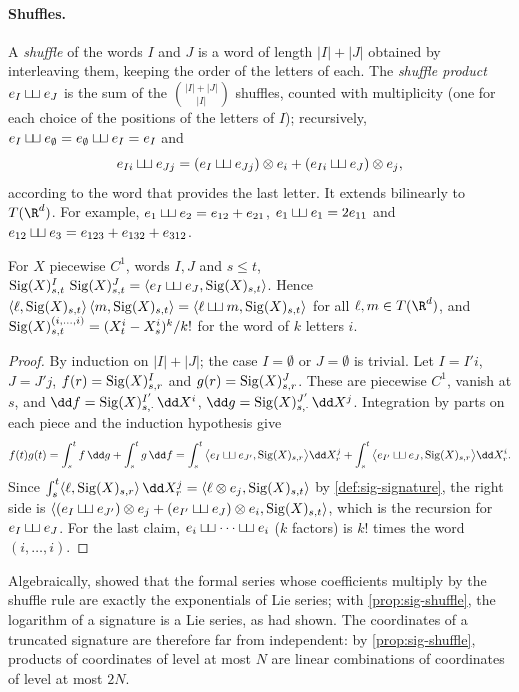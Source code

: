 \paragraph{Shuffles.} A \emph{shuffle} of the words $I$ and $J$ is a word of length $|I|+|J|$ obtained by
interleaving them, keeping the order of the letters of each. The \emph{shuffle product}
$e_I\mathbin{\sqcup\mkern-3mu\sqcup} e_J$ is the sum of the $\binom{|I|+|J|}{|I|}$ shuffles, counted with multiplicity (one for each choice
of the positions of the letters of $I$); recursively, $e_I\mathbin{\sqcup\mkern-3mu\sqcup} e_\emptyset=e_\emptyset\mathbin{\sqcup\mkern-3mu\sqcup} e_I=e_I$ and
\[
  e_{Ii}\mathbin{\sqcup\mkern-3mu\sqcup} e_{Jj}=(e_I\mathbin{\sqcup\mkern-3mu\sqcup} e_{Jj})\otimes e_i+(e_{Ii}\mathbin{\sqcup\mkern-3mu\sqcup} e_J)\otimes e_j,
\]
according to the word that provides the last letter. It extends bilinearly to $T(\R^d)$. For example,
$e_1\mathbin{\sqcup\mkern-3mu\sqcup} e_2=e_{12}+e_{21}$, $e_1\mathbin{\sqcup\mkern-3mu\sqcup} e_1=2e_{11}$ and $e_{12}\mathbin{\sqcup\mkern-3mu\sqcup} e_3=e_{123}+e_{132}+e_{312}$.

\begin{proposition}\label{prop:sig-shuffle}
For $X$ piecewise $C^1$, words $I,J$ and $s\le t$,
$\operatorname{Sig}(X)^I_{s,t}\,\operatorname{Sig}(X)^J_{s,t}=\langle e_I\mathbin{\sqcup\mkern-3mu\sqcup} e_J,\operatorname{Sig}(X)_{s,t}\rangle$. Hence
$\langle\ell,\operatorname{Sig}(X)_{s,t}\rangle\,\langle m,\operatorname{Sig}(X)_{s,t}\rangle=\langle\ell\mathbin{\sqcup\mkern-3mu\sqcup} m,\operatorname{Sig}(X)_{s,t}\rangle$ for all
$\ell,m\in T(\R^d)$, and $\operatorname{Sig}(X)^{(i,\dots,i)}_{s,t}=(X^i_t-X^i_s)^k/k!$ for the word of $k$ letters $i$.
\end{proposition}

\begin{proof}
By induction on $|I|+|J|$; the case $I=\emptyset$ or $J=\emptyset$ is trivial. Let $I=I'i$, $J=J'j$,
$f(r)=\operatorname{Sig}(X)^I_{s,r}$ and $g(r)=\operatorname{Sig}(X)^J_{s,r}$. These are piecewise $C^1$, vanish at $s$, and
$\dd f=\sigSig(X)^{I'}_{s,\cdot}\,\dd X^i$, $\dd g=\sigSig(X)^{J'}_{s,\cdot}\,\dd X^j$. Integration by parts on each piece
and the induction hypothesis give
\[
  f(t)g(t)=\int_s^tf\,\dd g+\int_s^tg\,\dd f
  =\int_s^t\big\langle e_I\sigsh e_{J'},\sigSig(X)_{s,r}\big\rangle\dd X^j_r+\int_s^t\big\langle e_{I'}\sigsh e_J,\sigSig(X)_{s,r}\big\rangle\dd X^i_r .
\]
Since $\int_s^t\langle\ell,\sigSig(X)_{s,r}\rangle\,\dd X^j_r=\langle\ell\otimes e_j,\sigSig(X)_{s,t}\rangle$ by
\cref{def:sig-signature}, the right side is $\langle(e_I\mathbin{\sqcup\mkern-3mu\sqcup} e_{J'})\otimes e_j+(e_{I'}\mathbin{\sqcup\mkern-3mu\sqcup} e_J)\otimes e_i,\operatorname{Sig}(X)_{s,t}\rangle$,
which is the recursion for $e_I\mathbin{\sqcup\mkern-3mu\sqcup} e_J$. For the last claim, $e_i\sigsh\dots\sigsh e_i$ ($k$ factors) is
$k!$ times the word $(i,\dots,i)$.
\end{proof}

Algebraically, \textcite{ree-1958} showed that the formal series whose coefficients multiply by the shuffle
rule are exactly the exponentials of Lie series; with \cref{prop:sig-shuffle}, the logarithm of a signature is
a Lie series, as \textcite{chen-1957} had shown. The coordinates of a truncated signature are therefore far from
independent: by \cref{prop:sig-shuffle}, products of coordinates of level at most $N$ are linear combinations
of coordinates of level at most $2N$.

